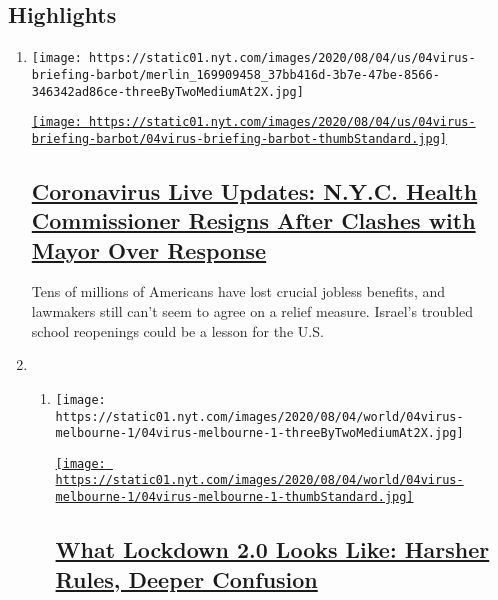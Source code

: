 \hypertarget{highlights}{%
\subsection{Highlights}\label{highlights}}

\begin{enumerate}
\def\labelenumi{\arabic{enumi}.}
\item
  \texttt{[image: https://static01.nyt.com/images/2020/08/04/us/04virus-briefing-barbot/merlin\_169909458\_37bb416d-3b7e-47be-8566-346342ad86ce-threeByTwoMediumAt2X.jpg]}

  \href{/2020/08/04/world/coronavirus-cases.html}{\texttt{[image: https://static01.nyt.com/images/2020/08/04/us/04virus-briefing-barbot/04virus-briefing-barbot-thumbStandard.jpg]}}

  \hypertarget{coronavirus-live-updates-nyc-health-commissioner-resigns-after-clashes-with-mayor-over-response}{%
  \subsection{\texorpdfstring{\href{/2020/08/04/world/coronavirus-cases.html}{Coronavirus
  Live Updates: N.Y.C. Health Commissioner Resigns After Clashes with
  Mayor Over
  Response}}{Coronavirus Live Updates: N.Y.C. Health Commissioner Resigns After Clashes with Mayor Over Response}}\label{coronavirus-live-updates-nyc-health-commissioner-resigns-after-clashes-with-mayor-over-response}}

  Tens of millions of Americans have lost crucial jobless benefits, and
  lawmakers still can't seem to agree on a relief measure. Israel's
  troubled school reopenings could be a lesson for the U.S.
\item
  \begin{enumerate}
  \def\labelenumii{\arabic{enumii}.}
  \item
    \texttt{[image: https://static01.nyt.com/images/2020/08/04/world/04virus-melbourne-1/04virus-melbourne-1-threeByTwoMediumAt2X.jpg]}

    \href{/2020/08/04/world/australia/coronavirus-melbourne-lockdown.html}{\texttt{[image: https://static01.nyt.com/images/2020/08/04/world/04virus-melbourne-1/04virus-melbourne-1-thumbStandard.jpg]}}

    \hypertarget{what-lockdown-20-looks-like-harsher-rules-deeper-confusion}{%
    \subsection{\texorpdfstring{\href{/2020/08/04/world/australia/coronavirus-melbourne-lockdown.html}{What
    Lockdown 2.0 Looks Like: Harsher Rules, Deeper
    Confusion}}{What Lockdown 2.0 Looks Like: Harsher Rules, Deeper Confusion}}\label{what-lockdown-20-looks-like-harsher-rules-deeper-confusion}}


\end{enumerate}
\end{enumerate}
